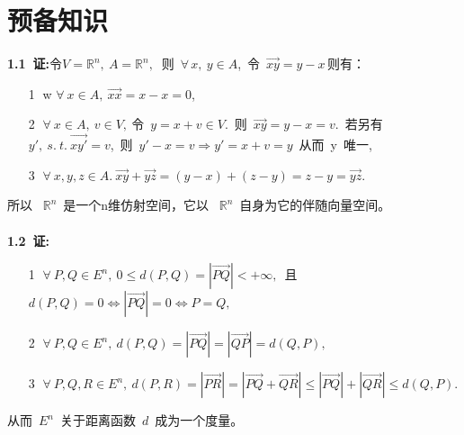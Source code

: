\chapter{预备知识}
	\noindent
	{\textbf{1.1\ 证:}}令$V=\mathbb{R}^n,\  A=\mathbb{R}^n,\ $ 则\  $\forall\,x,\ y\in{A}$,\ 令\ $\overrightarrow{xy}=y-x\,$则有：
	\begin{itemize}
		\item[\textcircled{1}]w
		$\forall\ x\in{A},\ \overrightarrow{xx}=x-x=\mathit{0}$,
		\item[\textcircled{2}]
		$\forall\ x\in{A},\ v\in{V},\ $令\ $y=x+v\in{V}$.\ 则\ $\overrightarrow{xy}=y-x=v$.\ 若另有\ $y',\ s.\ t.\ \overrightarrow{xy'}=v$,\ 则\ $y'-x=v\Rightarrow y'=x+v=y$\ 从而\ y\ 唯一,
		\item[\textcircled{3}]
		$\forall\ x,y,z\in A.\ \overrightarrow{xy}+\overrightarrow{yz}=(y-x)+(z-y)=z-y=\overrightarrow{yz}.\ $
	\end{itemize}
	所以 \ $\mathbb{R}^n$\ 是一个n维仿射空间，它以 \ $\mathbb{R}^n$\ 自身为它的伴随向量空间。
	\\
	\\
	
	\noindent
	{\textbf{1.2\ 证:}}
	\begin{itemize}
		\item[\textcircled{1}]
		$\forall\  P,Q\in E^n,\ 0\leqslant d(P,Q)=\left|\overrightarrow{PQ}\right|<+\infty,$\ 且$d(P,Q)=0\Leftrightarrow\left|\overrightarrow{PQ}\right|=0\Leftrightarrow P=Q,$ 
		\item[\textcircled{2}] 
		$\forall\ P,Q\in E^n,\ d(P,Q)=\left|\overrightarrow{PQ}\right|=\left|\overrightarrow{QP}\right|=d(Q,P),$
		\item[\textcircled{3}] 
		$\forall\  P, Q, R\in E^n,\  d(P,R)=\left|\overrightarrow{PR}\right|=\left|\overrightarrow{PQ}+\overrightarrow{QR}\right|\leqslant\left|\overrightarrow{PQ}\right|+\left|\overrightarrow{QR}\right|\leqslant d(Q,P).$
	\end{itemize}
	从而\ $E^n$\ 关于距离函数\ $d$\ 成为一个度量。
	\\
	\\
	
